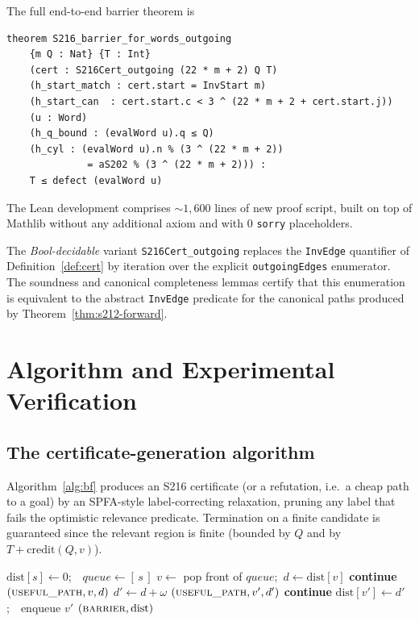 \documentclass[11pt,a4paper]{article}
\theoremstyle{plain}
\theoremstyle{definition}
\theoremstyle{plain}
\newcommand{\credit}{\mathrm{credit}}
\begin{document}
\noindent The full end-to-end barrier theorem is
\begin{lstlisting}
theorem S216_barrier_for_words_outgoing
    {m Q : Nat} {T : Int}
    (cert : S216Cert_outgoing (22 * m + 2) Q T)
    (h_start_match : cert.start = InvStart m)
    (h_start_can  : cert.start.c < 3 ^ (22 * m + 2 + cert.start.j))
    (u : Word)
    (h_q_bound : (evalWord u).q ≤ Q)
    (h_cyl : (evalWord u).n % (3 ^ (22 * m + 2))
              = aS202 % (3 ^ (22 * m + 2))) :
    T ≤ defect (evalWord u)
\end{lstlisting}

\noindent
The Lean development comprises ${\sim}1{,}600$ lines of new proof
script, built on top of Mathlib without any additional axiom and with
$0$ \texttt{sorry} placeholders.

The \emph{Bool-decidable} variant \texttt{S216Cert\_outgoing} replaces
the \texttt{InvEdge} quantifier of Definition~\ref{def:cert} by
iteration over the explicit \texttt{outgoingEdges} enumerator. The
soundness and canonical completeness lemmas certify that this
enumeration is equivalent to the abstract \texttt{InvEdge} predicate
for the canonical paths produced by Theorem~\ref{thm:s212-forward}.

\section{Algorithm and Experimental Verification}\label{sec:experiments}

\subsection{The certificate-generation algorithm}
Algorithm~\ref{alg:bf} produces an S216 certificate (or a refutation,
i.e.\ a cheap path to a goal) by an SPFA-style label-correcting
relaxation, pruning any label that fails the optimistic relevance
predicate. Termination on a finite candidate is guaranteed since the
relevant region is finite (bounded by $Q$ and by $T + \credit(Q,v)$).

\begin{algorithm}[h]
\caption{S216 BF closure (relevance-pruned label correction)}\label{alg:bf}
\begin{algorithmic}[1]
\State $\mathrm{dist}[s] \gets 0$;\ \ $\mathit{queue} \gets [\,s\,]$
  \State $v \gets$ pop front of $\mathit{queue}$;\ $d \gets \mathrm{dist}[v]$
   \textbf{continue} 
  \EndIf
   \Return $(\textsc{useful\_path}, v, d)$
  \EndIf
    \State $d' \gets d + \omega$
     \Return $(\textsc{useful\_path}, v', d')$
    \EndIf
     \textbf{continue} 
    \EndIf
      \State $\mathrm{dist}[v'] \gets d'$;\ \ enqueue $v'$
    \EndIf
  \EndFor
\EndWhile
\State \Return $(\textsc{barrier}, \mathrm{dist})$
\end{algorithmic}
\end{algorithm}
\end{document}
